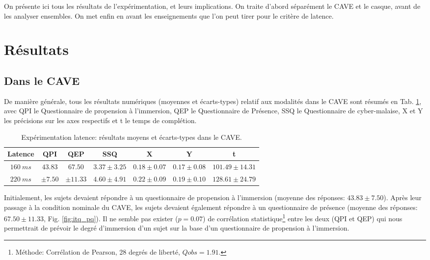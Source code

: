 	\par On présente ici tous les résultats de l'expérimentation, et leurs implications. On traite d'abord séparément le CAVE et le casque, avant de les analyser ensembles. On met enfin en avant les enseignements que l'on peut tirer pour le critère de latence.
	
	\section{Résultats}
	\subsection{Dans le CAVE}
	\par De manière générale, tous les résultats numériques (moyennes et écarts-types) relatif aux modalités dans le CAVE sont résumés en Tab. \ref{tab:resultats_cave_latence}, avec QPI le Questionnaire de propension à l'immersion, QEP le Questionnaire de Présence, SSQ le Questionnaire de cyber-malaise, X et Y les précisions sur les axes respectifs et t le temps de complétion.
	
	\begin{table}[h]	
		\centering
		\caption{Expérimentation latence: résultats moyens et écarts-types dans le CAVE.}
		\label{tab:resultats_cave_latence}
		\begin{tabular}{c|c|c|c|c|c|c}
			\textbf{Latence} & \textbf{QPI} & \textbf{QEP} & \textbf{SSQ} & \textbf{X} & \textbf{Y} & \textbf{t}\\ \hline			
			$160~ms$ & $43.83$ & $67.50$ & $3.37 \pm 3.25$ & $0.18 \pm 0.07$ & $0.17 \pm 0.08$ & $101.49 \pm 14.31$\\
			$220~ms$ & $\pm 7.50$ & $\pm 11.33$ & $4.60 \pm 4.91$ & $0.22 \pm 0.09$ & $0.19 \pm 0.10$ & $128.61 \pm 24.79$\\
		\end{tabular}
	\end{table}
	
	\par Initialement, les sujets devaient répondre à un questionnaire de propension à l'immersion (moyenne des réponses: $43.83 \pm 7.50$).	Après leur passage à la condition nominale du CAVE, les sujets devaient également répondre à un questionnaire de présence (moyenne des réponses: $67.50 \pm 11.33$, Fig. \ref{fig:itq_pq}). Il ne semble pas exister ($p = 0.07$) de corrélation statistique\footnote{Méthode: Corrélation de Pearson, 28 degrés de liberté, $Qobs = 1.91$.} entre les deux (QPI et QEP) qui nous permettrait de prévoir le degré d'immersion d'un sujet sur la base d'un questionnaire de propension à l'immersion.
	
